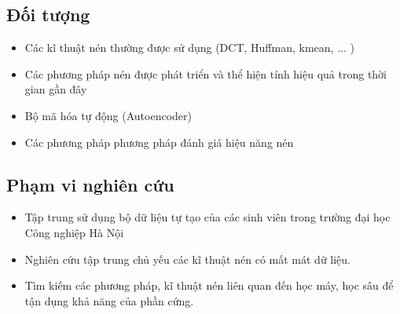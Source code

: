 \subsection{Đối tượng}
\begin{itemize}
      \item Các kĩ thuật nén thường được sử dụng (DCT, Huffman, kmean, ... )
      \item Các phương pháp nén được phát triển và thể hiện tính hiệu quả trong thời gian gần đây
      \item Bộ mã hóa tự động (Autoencoder)
      \item Các phương pháp phương pháp đánh giá hiệu năng nén
\end{itemize}
\newpage
\subsection{Phạm vi nghiên cứu}
\begin{itemize}
      \item Tập trung sử dụng bộ dữ liệu tự tạo của các sinh viên trong trường đại học Công nghiệp Hà Nội
      \item Nghiên cứu tập trung chủ yếu các kĩ thuật nén có mất mát dữ liệu.
      \item Tìm kiếm các phương pháp, kĩ thuật nén liên quan đến học máy, học sâu để
            tận dụng khả năng của phần cứng.
\end{itemize}





